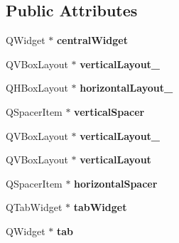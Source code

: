 \subsection*{Public Attributes}
\begin{DoxyCompactItemize}
\item 
\hypertarget{classUi__MainWindow_a30075506c2116c3ed4ff25e07ae75f81}{Q\-Widget $\ast$ {\bfseries central\-Widget}}\label{classUi__MainWindow_a30075506c2116c3ed4ff25e07ae75f81}

\item 
\hypertarget{classUi__MainWindow_a6f40fc110b15410c00837a446d57bdbe}{Q\-V\-Box\-Layout $\ast$ {\bfseries vertical\-Layout\-\_}}\label{classUi__MainWindow_a6f40fc110b15410c00837a446d57bdbe}

\item 
\hypertarget{classUi__MainWindow_a03ce63974cc69b067c91bbf285cceca8}{Q\-H\-Box\-Layout $\ast$ {\bfseries horizontal\-Layout\-\_}}\label{classUi__MainWindow_a03ce63974cc69b067c91bbf285cceca8}

\item 
\hypertarget{classUi__MainWindow_a8384329c3663ff274e926a12024aab52}{Q\-Spacer\-Item $\ast$ {\bfseries vertical\-Spacer}}\label{classUi__MainWindow_a8384329c3663ff274e926a12024aab52}

\item 
\hypertarget{classUi__MainWindow_a0c01bad60d9f422a1258e710635a2f65}{Q\-V\-Box\-Layout $\ast$ {\bfseries vertical\-Layout\-\_}}\label{classUi__MainWindow_a0c01bad60d9f422a1258e710635a2f65}

\item 
\hypertarget{classUi__MainWindow_aecd96a04789fcfec3f98d80390ad8184}{Q\-V\-Box\-Layout $\ast$ {\bfseries vertical\-Layout}}\label{classUi__MainWindow_aecd96a04789fcfec3f98d80390ad8184}

\item 
\hypertarget{classUi__MainWindow_a7871ea8c4b6c595d7ccd53960b344719}{Q\-Spacer\-Item $\ast$ {\bfseries horizontal\-Spacer}}\label{classUi__MainWindow_a7871ea8c4b6c595d7ccd53960b344719}

\item 
\hypertarget{classUi__MainWindow_a3260b943854b841c986f47c4726ee7f9}{Q\-Tab\-Widget $\ast$ {\bfseries tab\-Widget}}\label{classUi__MainWindow_a3260b943854b841c986f47c4726ee7f9}

\item 
\hypertarget{classUi__MainWindow_a3efc28c664e9f5115095aafbbc5ac6bc}{Q\-Widget $\ast$ {\bfseries tab}}\label{classUi__MainWindow_a3efc28c664e9f5115095aafbbc5ac6bc}


\end{DoxyCompactItemize}
